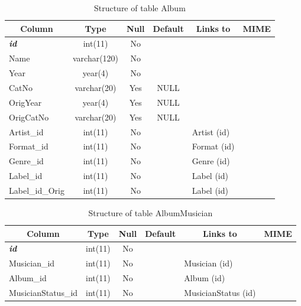 \documentclass[10pt,a4paper,oneside,notitlepage]{article}
\begin{document}
%
% 
% 

%
%
 \begin{longtable}{|l|c|c|c|l|l|} 
 \caption{Structure of table Album} \label{tab:Album-structure} \\
 \hline \multicolumn{1}{|c|}{\textbf{Column}} & \multicolumn{1}{|c|}{\textbf{Type}} & \multicolumn{1}{|c|}{\textbf{Null}} & \multicolumn{1}{|c|}{\textbf{Default}} & \multicolumn{1}{|c|}{\textbf{Links to}} & \multicolumn{1}{|c|}{\textbf{MIME}} \\ \hline \hline
\textbf{\textit{id}} & int(11) & No &  &  &  \\ \hline 
Name & varchar(120) & No &  &  &  \\ \hline 
Year & year(4) & No &  &  &  \\ \hline 
CatNo & varchar(20) & Yes & NULL &  &  \\ \hline 
OrigYear & year(4) & Yes & NULL &  &  \\ \hline 
OrigCatNo & varchar(20) & Yes & NULL &  &  \\ \hline 
Artist\_id & int(11) & No &  & Artist (id) &  \\ \hline 
Format\_id & int(11) & No &  & Format (id) &  \\ \hline 
Genre\_id & int(11) & No &  & Genre (id) &  \\ \hline 
Label\_id & int(11) & No &  & Label (id) &  \\ \hline 
Label\_id\_Orig & int(11) & No &  & Label (id) &  \\ \hline 
 \end{longtable}

%
%
 \begin{longtable}{|l|c|c|c|l|l|} 
 \caption{Structure of table AlbumMusician} \label{tab:AlbumMusician-structure} \\
 \hline \multicolumn{1}{|c|}{\textbf{Column}} & \multicolumn{1}{|c|}{\textbf{Type}} & \multicolumn{1}{|c|}{\textbf{Null}} & \multicolumn{1}{|c|}{\textbf{Default}} & \multicolumn{1}{|c|}{\textbf{Links to}} & \multicolumn{1}{|c|}{\textbf{MIME}} \\ \hline \hline
\textbf{\textit{id}} & int(11) & No &  &  &  \\ \hline 
Musician\_id & int(11) & No &  & Musician (id) &  \\ \hline 
Album\_id & int(11) & No &  & Album (id) &  \\ \hline 
MusicianStatus\_id & int(11) & No &  & MusicianStatus (id) &  \\ \hline 
 \end{longtable}
\end{document}
